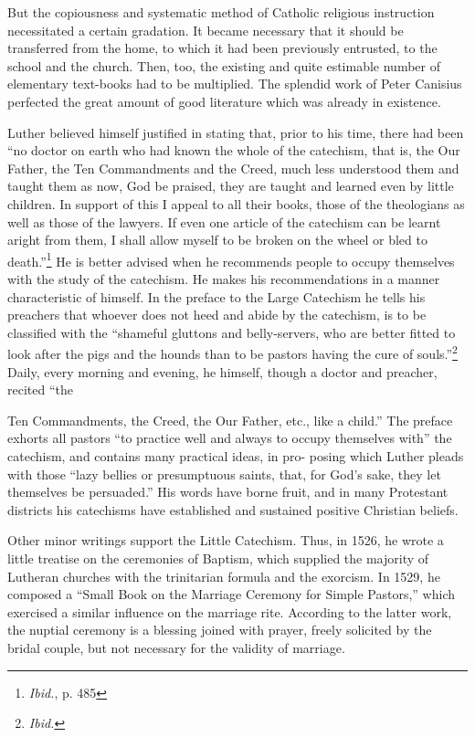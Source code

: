 But the
copiousness and systematic method of Catholic religious instruction
necessitated a certain gradation. It became necessary that it should be
transferred from the home, to which it had been previously entrusted,
to the school and the church. Then, too, the existing and quite estimable
number of elementary text-books had to be multiplied. The
splendid work of Peter Canisius perfected the great amount of good
literature which was already in existence.

Luther believed himself justified in stating that, prior to his time, there
had been “no doctor on earth who had known the whole of the catechism,
that is, the Our Father, the Ten Commandments and the Creed, much less
understood them and taught them as now, God be praised, they are taught
and learned even by little children. In support of this I appeal to all their
books, those of the theologians as well as those of the lawyers. If even one
article of the catechism can be learnt aright from them, I shall allow myself
to be broken on the wheel or bled to death.”\footnote{\textit{Ibid.}, p. 485}
 He is better advised when he
recommends people to occupy themselves with the study of the catechism. He
makes his recommendations in a manner characteristic of himself. In the
preface to the Large Catechism he tells his preachers that whoever does not
heed and abide by the catechism, is to be classified with the “shameful
gluttons and belly-servers, who are better fitted to look after the pigs and
the hounds than to be pastors having the cure of souls.”\footnote{\textit{Ibid.}}
 Daily, every
morning and evening, he himself, though a doctor and preacher, recited “the

Ten Commandments, the Creed, the Our Father, etc., like a child.” The
preface exhorts all pastors “to practice well and always to occupy
themselves with” the catechism, and contains many practical ideas, in pro-
posing which Luther pleads with those “lazy bellies or presumptuous saints,
that, for God’s sake, they let themselves be persuaded.” His words have borne
fruit, and in many Protestant districts his catechisms have established and
sustained positive Christian beliefs.

Other minor writings support the Little Catechism. Thus, in 1526,
he wrote a little treatise on the ceremonies of Baptism, which supplied
the majority of Lutheran churches with the trinitarian formula and
the exorcism. In 1529, he composed a “Small Book on the Marriage
Ceremony for Simple Pastors,” which exercised a similar influence on
the marriage rite. According to the latter work, the nuptial ceremony
is a blessing joined with prayer, freely solicited by the bridal couple,
but not necessary for the validity of marriage.

